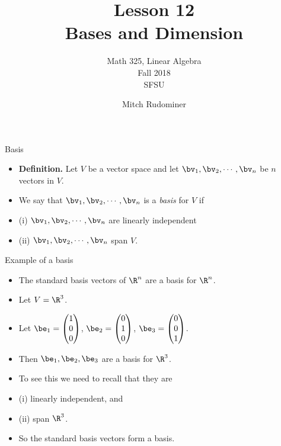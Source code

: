 \documentclass{beamer}
\title{Lesson 12 \\ Bases and Dimension}
\subtitle{Math 325, Linear Algebra \\ Fall 2018 \\ SFSU}
\author{Mitch Rudominer}
\date{}
\begin{document}
\begin{frame}
  \titlepage
\end{frame}


\begin{frame}{Basis}

\begin{itemize}
\item \textbf{Definition.} Let $V$ be a vector space and let $\bv_1,\bv_2,\cdots,\bv_n$ be $n$ vectors in $V$.
\item We say that $\bv_1,\bv_2,\cdots,\bv_n$ is a \emph{basis} for $V$ if
\item (i) $\bv_1,\bv_2,\cdots,\bv_n$ are linearly independent
\item (ii) $\bv_1,\bv_2,\cdots,\bv_n$ span $V$.
\end{itemize}
\end{frame}

\begin{frame}{Example of a basis}

\begin{itemize}
\item The standard basis vectors of $\R^n$ are a basis for $\R^n$.
\item Let $V = \R^3$.
\item Let $\be_1 =
\begin{pmatrix}
1 \\ 0 \\ 0
\end{pmatrix}
$,
$\be_2 =
\begin{pmatrix}
0 \\ 1 \\ 0
\end{pmatrix}
$,
$\be_3=
\begin{pmatrix}
0 \\ 0 \\ 1
\end{pmatrix}
$.

\item Then $\be_1,\be_2,\be_3$ are a basis for $\R^3$.
\item To see this we need to recall that they are
\item (i) linearly independent, and
\item (ii) span $\R^3$.
\item So the standard basis vectors form a basis.
\end{itemize}

\end{frame}
\end{document}
